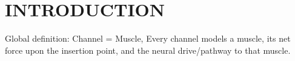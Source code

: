 \section{INTRODUCTION}

Global definition:
Channel = Muscle, Every channel models a muscle, its net force upon the insertion point, and the neural drive/pathway to that muscle.



